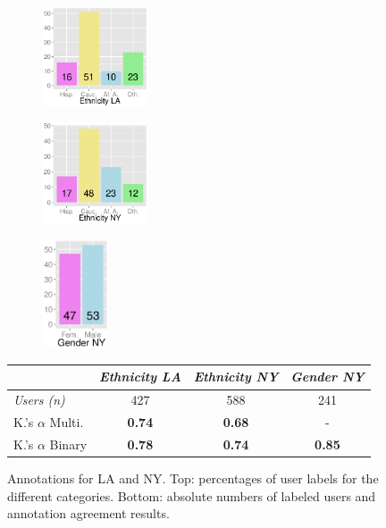 \begin{figure}[htp]
	\centering
	\begin{subfigure}[t]{1.22in}
		\centering
		\includegraphics[width=1.22in]{fig/footprints/la_eth_bar.eps}
	\end{subfigure}
	\begin{subfigure}[t]{1.22in}
		\centering
		\includegraphics[width=1.22in]{fig/footprints/ny_eth_bar.eps}
	\end{subfigure}
	\begin{subfigure}[t]{0.76in}
		\centering
		\includegraphics[width=0.76in]{fig/footprints/ny_gender_bar.eps}
	\end{subfigure}
{\small
\begin{tabular}{| l | c | c | c |}
\hline
                          & {\textit{Ethnicity LA}} & {\textit{Ethnicity NY}} & {\textit{Gender NY}} \\ \hline
{\textit{Users (n)}}      & 427                     & 588                     & 241 \\ \hline
K.'s $\alpha$ Multi.      & \textbf{0.74}           & \textbf{0.68}           & -   \\ \hline
K.'s $\alpha$ Binary      & \textbf{0.78}           & \textbf{0.74}           & \textbf{0.85} \\ \hline
\end{tabular}
}
\vspace{0.7ex}
	\caption{Annotations for LA and NY. Top: percentages of user labels for the different categories. Bottom: absolute numbers of labeled users and annotation agreement results.}
	\label{fig:demographics}
\end{figure}


